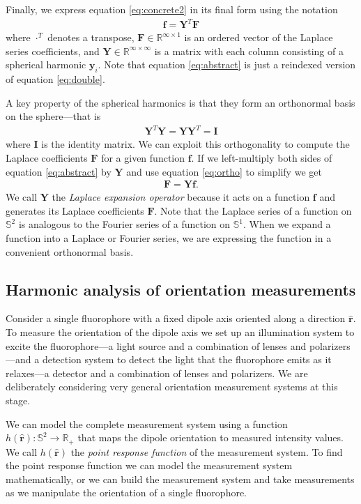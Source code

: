 \documentclass[10pt]{article}
\providecommand{\mb}[1]{\mathbf{#1}}
\providecommand{\mh}[1]{\mathbf{\hat{#1}}}
\providecommand{\mbb}[1]{\mathbb{#1}}
\begin{document}
Finally, we express equation \ref{eq:concrete2} in its final form using the
notation
\begin{align}
 \mb{f} = \mb{Y}^T\mb{F} \label{eq:abstract}
\end{align}
where $\cdot^T$ denotes a transpose, $\mb{F}\in\mbb{R}^{\infty\times 1}$ is an
ordered vector of the Laplace series coefficients, and
$\mb{Y}\in\mbb{R}^{\infty \times \infty}$ is a matrix with each column
consisting of a spherical harmonic $\mb{y}_i$. Note that equation
\ref{eq:abstract} is just a reindexed version of equation \ref{eq:double}.

A key property of the spherical harmonics is that they form an orthonormal basis
on the sphere---that is
\begin{align}
  \mb{Y}^T\mb{Y} = \mb{Y}\mb{Y}^T = \mb{I} \label{eq:ortho}
\end{align}
where $\mb{I}$ is the identity matrix. We can exploit this orthogonality to
compute the Laplace coefficients $\mb{F}$ for a given function $\mb{f}$. If we
left-multiply both sides of equation \ref{eq:abstract} by $\mb{Y}$ and use
equation \ref{eq:ortho} to simplify we get
\begin{align}
  \mb{F} = \mb{Y}\mb{f}. 
\end{align}
We call $\mb{Y}$ the \textit{Laplace expansion operator} because it acts on a
function $\mb{f}$ and generates its Laplace coefficients $\mb{F}$. Note that the
Laplace series of a function on $\mbb{S}^2$ is analogous to the Fourier series
of a function on $\mbb{S}^1$. When we expand a function into a Laplace or
Fourier series, we are expressing the function in a convenient orthonormal
basis.

\subsection{Harmonic analysis of orientation measurements}
Consider a single fluorophore with a fixed dipole axis oriented along a
direction $\mh{r}$. To measure the orientation of the dipole axis we set up an
illumination system to excite the fluorophore---a light source and a combination
of lenses and polarizers---and a detection system to detect the light that the
fluorophore emits as it relaxes---a detector and a combination of lenses and
polarizers. We are deliberately considering very general orientation
measurement systems at this stage.

We can model the complete measurement system using a function
$h(\mh{r}): \mbb{S}^2 \rightarrow \mbb{R}_+$ that maps the dipole orientation to
measured intensity values. We call $h(\mh{r})$ the \textit{point response
  function} of the measurement system. To find the point response function we
can model the measurement system mathematically, or we can build the measurement
system and take measurements as we manipulate the orientation of a single
fluorophore.
\end{document}
